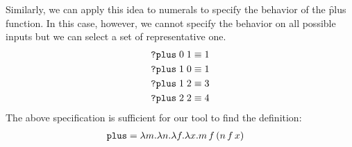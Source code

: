 Similarly, we can apply this idea to numerals to specify the
behavior of the \f{plus} function.
%
In this case, however, we cannot specify the behavior on all
possible inputs but we can select a set of representative one.
%
\begin{align*}
  \texttt{?plus}\; 0\; 1 &\equiv 1\\
  \texttt{?plus}\; 1\; 0 &\equiv 1\\
  \texttt{?plus}\; 1\; 2 &\equiv 3\\
  \texttt{?plus}\; 2\; 2 &\equiv 4\\
\end{align*}
%
The above specification is sufficient for our tool to find
the definition:
%
\begin{align*}
  \texttt{plus} &= \lambda m. \lambda n. \lambda f. \lambda x. m\,f\,(n\,f\,x)
\end{align*}

